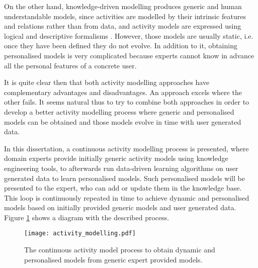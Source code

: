 
On the other hand, knowledge-driven modelling produces generic and human understandable models, since activities are modelled by their intrinsic features and relations rather than from data, and activity models are expressed using logical and descriptive formalisms \cite{Chen2012a}. However, those models are usually static, i.e. once they have been defined they do not evolve. In addition to it, obtaining personalised models is very complicated because experts cannot know in advance all the personal features of a concrete user. 


It is quite clear then that both activity modelling approaches have complementary advantages and disadvantages. An approach excels where the other fails. It seems natural thus to try to combine both approaches in order to develop a better activity modelling process where generic and personalised models can be obtained and those models evolve in time with user generated data. 

In this dissertation, a continuous activity modelling process is presented, where domain experts provide initially generic activity models using knowledge engineering tools, to afterwards run data-driven learning algorithms on user generated data to learn personalised models. Such personalised models will be presented to the expert, who can add or update them in the knowledge base. This loop is continuously repeated in time to achieve dynamic and personalised models based on initially provided generic models and user generated data. Figure \ref{fig-activity-modelling} shows a diagram with the described process.

\begin{figure}[htbp]
\centering
\texttt{[image: activity\_modelling.pdf]}
    \caption{The continuous activity model process to obtain dynamic and personalised models from generic expert provided models.}
    \label{fig-activity-modelling}
\end{figure}

